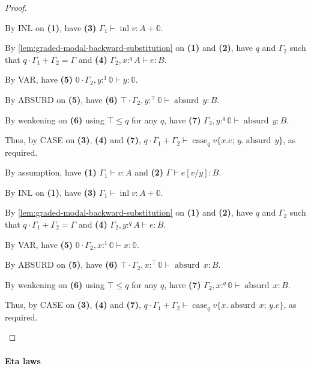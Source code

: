 \documentclass[acmsmall,screen,nonacm]{acmart}
\DeclareMathOperator{\case}{\text{case}}
\newcommand{\zero}{\mathbb{0}}
\DeclareMathOperator{\inl}{\text{inl}}
\DeclareMathOperator{\absurd}{\text{absurd}}
\newcommand{\tee}{\vdash}
\DeclareMathOperator{\red}{\rightsquigarrow}
\begin{document}
\begin{proof}
\begin{description}
    By INL on \textbf{(1)}, have \textbf{(3)} $\Gamma_1 \tee \inl v : A + \zero$.

    By \ref{lem:graded-modal-backward-substitution} on \textbf{(1)} and \textbf{(2)}, have $q$ and $\Gamma_2$ such that $q \cdot \Gamma_1 + \Gamma_2 = \Gamma$ and \textbf{(4)} $\Gamma_2, x :^q A \tee e : B$.

    By VAR, have \textbf{(5)} $0 \cdot \Gamma_2, y :^1 \zero \tee y : \zero$.

    By ABSURD on \textbf{(5)}, have \textbf{(6)} $\top \cdot \Gamma_2, y :^\top \zero \tee \absurd \, y : B$.

    By weakening on \textbf{(6)} using $\top \le q$ for any $q$, have \textbf{(7)} $\Gamma_2, y :^q \zero \tee \absurd \, y : B$.

    Thus, by CASE on \textbf{(3)}, \textbf{(4)} and \textbf{(7)}, $q \cdot \Gamma_1 + \Gamma_2 \tee \case_q v \{ x.e; \, y.\absurd \, y \}$, as required.
    \\
    \item[\mbox{Case $e[v/y] \red \case_q v \{x.\absurd \, x; y.e\} : A$}.]
    By assumption, have \textbf{(1)} $\Gamma_1 \tee v : A$ and \textbf{(2)} $\Gamma \tee e[v/y] : B$.
    
    By INL on \textbf{(1)}, have \textbf{(3)} $\Gamma_1 \tee \inl v : A + \zero$.

    By \ref{lem:graded-modal-backward-substitution} on \textbf{(1)} and \textbf{(2)}, have $q$ and $\Gamma_2$ such that $q \cdot \Gamma_1 + \Gamma_2 = \Gamma$ and \textbf{(4)} $\Gamma_2, y :^q A \tee e : B$.

    By VAR, have \textbf{(5)} $0 \cdot \Gamma_2, x :^1 \zero \tee x : \zero$.

    By ABSURD on \textbf{(5)}, have \textbf{(6)} $\top \cdot \Gamma_2, x :^\top \zero \tee \absurd \, x : B$.

    By weakening on \textbf{(6)} using $\top \le q$ for any $q$, have \textbf{(7)} $\Gamma_2, x :^q \zero \tee \absurd \, x : B$.

    Thus, by CASE on \textbf{(3)}, \textbf{(4)} and \textbf{(7)}, $q \cdot \Gamma_1 + \Gamma_2 \tee \case_q v \{ x.\absurd \, x; \, y.e \}$, as required.
  \end{description}
\end{proof}

\paragraph{Eta laws}
\end{document}
